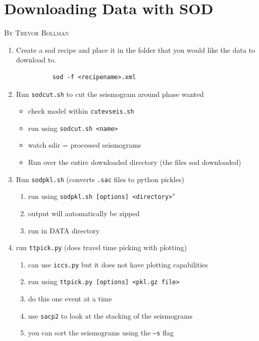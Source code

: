 \documentclass[letterpaper,10pt]{article}
\begin{document}
\section{Downloading Data with SOD}

\textsc{By Trevor Bollman}

\begin{enumerate}
  \item Create a sod recipe and place it in the folder that you would like the data to download to.
        \begin{verbatim}
          sod -f <recipename>.xml
        \end{verbatim}
  \item Run \verb"sodcut.sh" to cut the seismogram around phase wanted
        \begin{itemize}
          \item check model within \verb"cutevseis.sh"
          \item run using \verb"sodcut.sh <name>"
          \item watch sdir = processed seismograms
          \item Run over the entire downloaded directory (the files sod downloaded)
        \end{itemize}
  \item Run \verb"sodpkl.sh" (converts \verb".sac" files to python pickles)
        \begin{enumerate}
          \item run using \verb"sodpkl.sh [options] <directory>""
          \item output will automatically be zipped
          \item run in DATA directory
        \end{enumerate}
  \item run \verb"ttpick.py" (does travel time picking with plotting)
        \begin{enumerate}
          \item can use \verb"iccs.py" but it does not have plotting capabilities
          \item run using \verb"ttpick.py [options] <pkl.gz file>"
          \item do this one event at a time
          \item use \verb"sacp2" to look at the stacking of the seismograms
          \item you can sort the seismograms using the \verb"–s" flag
        \end{enumerate}

\end{enumerate}
\end{document}
